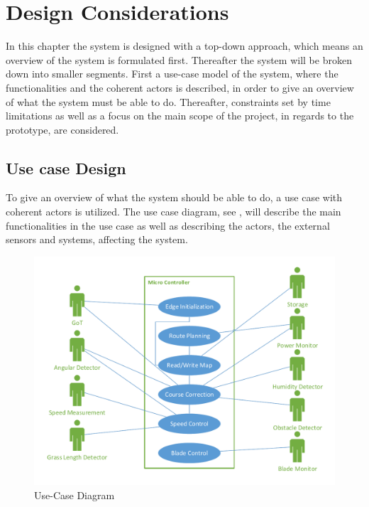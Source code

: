 \chapter{Design Considerations}
\vspace{-5 mm}
In this chapter the system is designed with a top-down approach, which means an overview of the system is formulated first. Thereafter the system will be broken down into smaller segments. First a use-case model of the system, where the functionalities and the coherent actors is described, in order to give an overview of what the system must be able to do. Thereafter, constraints set by time limitations as well as a focus on the main scope of the project, in regards to the prototype, are considered.
\vspace{-4 mm}
\section{Use case Design} \label{sec:UseCase}
To give an overview of what the system should be able to do, a use case with coherent actors is utilized. The use case diagram, see , will describe the main functionalities in the use case as well as describing the actors, the external sensors and systems, affecting the system.


\vspace{-3 mm}
 \begin{figure}[H]
	\centering
	\includegraphics[scale=0.8]{figures/P5UseCase.pdf}
	\caption{Use-Case Diagram}
	\label{fig:usecase}
\end{figure}

